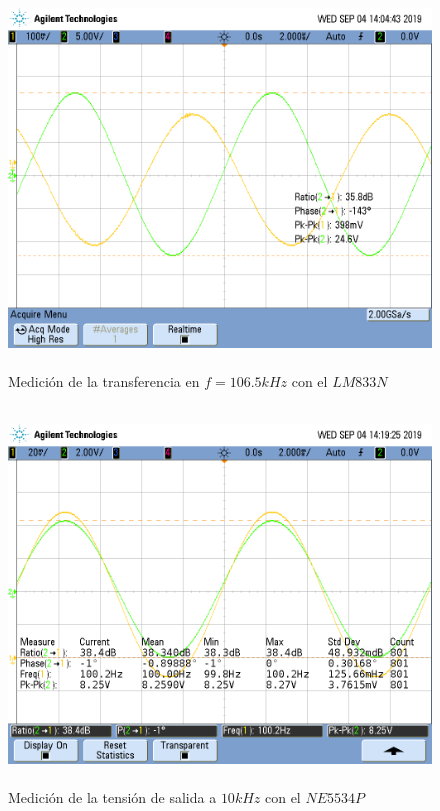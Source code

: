 \begin{figure}
\begin{center}
\includegraphics[height=10cm]{./rsc/lm_1.png}
\caption{Medición de la transferencia en $f=106.5 kHz$ con el $LM833N$}
\label{fig:e2_lm_fB}
\end{center}
\end{figure}

\begin{figure}
\begin{center}
\includegraphics[height=10cm]{./rsc/ne_0.png}
\caption{Medición de la tensión de salida a $10 kHz$ con el $NE5534P$}
\label{fig:e2_ne_10k}
\end{center}
\end{figure}

